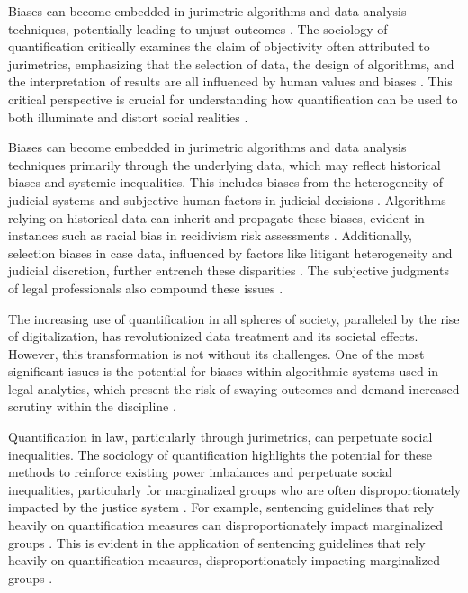 Biases can become embedded in jurimetric algorithms and data analysis techniques, potentially leading to unjust outcomes \cite{10.1057/s41599-020-00557-0,de2010jurimetrics}. The sociology of quantification critically examines the claim of objectivity often attributed to jurimetrics, emphasizing that the selection of data, the design of algorithms, and the interpretation of results are all influenced by human values and biases \cite{10.1057/s41599-020-00557-0,de2010jurimetrics}. This critical perspective is crucial for understanding how quantification can be used to both illuminate and distort social realities \cite{10.1057/s41599-020-00557-0,de2010jurimetrics}.

Biases can become embedded in jurimetric algorithms and data analysis techniques primarily through the underlying data, which may reflect historical biases and systemic inequalities. This includes biases from the heterogeneity of judicial systems and subjective human factors in judicial decisions \cite{silva2023,ribeiro1998}. Algorithms relying on historical data can inherit and propagate these biases, evident in instances such as racial bias in recidivism risk assessments \cite{gillborn2017}. Additionally, selection biases in case data, influenced by factors like litigant heterogeneity and judicial discretion, further entrench these disparities \cite{ribeiro2021,nunes2016}. The subjective judgments of legal professionals also compound these issues \cite{ribeiro2021}.

The increasing use of quantification in all spheres of society, paralleled by the rise of digitalization, has revolutionized data treatment and its societal effects. However, this transformation is not without its challenges. One of the most significant issues is the potential for biases within algorithmic systems used in legal analytics, which present the risk of swaying outcomes and demand increased scrutiny within the discipline \cite{10.1590/dados.2022.65.3.267,1023071190721}.

Quantification in law, particularly through jurimetrics, can perpetuate social inequalities. The sociology of quantification highlights the potential for these methods to reinforce existing power imbalances and perpetuate social inequalities, particularly for marginalized groups who are often disproportionately impacted by the justice system \cite{10.1590/dados.2022.65.3.267,10.32586/rcda.v18i1.585}. For example, sentencing guidelines that rely heavily on quantification measures can disproportionately impact marginalized groups \cite{10.1590/dados.2022.65.3.267,10.3390/fi9040068}. This is evident in the application of sentencing guidelines that rely heavily on quantification measures, disproportionately impacting marginalized groups \cite{10.1590/dados.2022.65.3.267,10.3390/fi9040068}.

